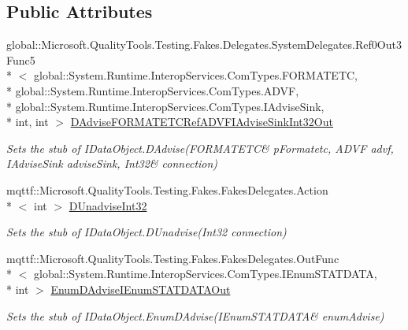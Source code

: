 \subsection*{Public Attributes}
\begin{DoxyCompactItemize}
\item 
global\-::\-Microsoft.\-Quality\-Tools.\-Testing.\-Fakes.\-Delegates.\-System\-Delegates.\-Ref0\-Out3\-Func5\\*
$<$ global\-::\-System.\-Runtime.\-Interop\-Services.\-Com\-Types.\-F\-O\-R\-M\-A\-T\-E\-T\-C, \\*
global\-::\-System.\-Runtime.\-Interop\-Services.\-Com\-Types.\-A\-D\-V\-F, \\*
global\-::\-System.\-Runtime.\-Interop\-Services.\-Com\-Types.\-I\-Advise\-Sink, \\*
int, int $>$ \hyperlink{class_system_1_1_runtime_1_1_interop_services_1_1_com_types_1_1_fakes_1_1_stub_i_data_object_a64d717ebe75e5eb2a2b469bf6dd5d526}{D\-Advise\-F\-O\-R\-M\-A\-T\-E\-T\-C\-Ref\-A\-D\-V\-F\-I\-Advise\-Sink\-Int32\-Out}
\begin{DoxyCompactList}\small\item\em Sets the stub of I\-Data\-Object.\-D\-Advise(F\-O\-R\-M\-A\-T\-E\-T\-C\& p\-Formatetc, A\-D\-V\-F advf, I\-Advise\-Sink advise\-Sink, Int32\& connection)\end{DoxyCompactList}\item 
mqttf\-::\-Microsoft.\-Quality\-Tools.\-Testing.\-Fakes.\-Fakes\-Delegates.\-Action\\*
$<$ int $>$ \hyperlink{class_system_1_1_runtime_1_1_interop_services_1_1_com_types_1_1_fakes_1_1_stub_i_data_object_adb19c372293877e1ccf66409179c1d25}{D\-Unadvise\-Int32}
\begin{DoxyCompactList}\small\item\em Sets the stub of I\-Data\-Object.\-D\-Unadvise(\-Int32 connection)\end{DoxyCompactList}\item 
mqttf\-::\-Microsoft.\-Quality\-Tools.\-Testing.\-Fakes.\-Fakes\-Delegates.\-Out\-Func\\*
$<$ global\-::\-System.\-Runtime.\-Interop\-Services.\-Com\-Types.\-I\-Enum\-S\-T\-A\-T\-D\-A\-T\-A, \\*
int $>$ \hyperlink{class_system_1_1_runtime_1_1_interop_services_1_1_com_types_1_1_fakes_1_1_stub_i_data_object_a906bad84d27c951d601ab7fd1b34a2c3}{Enum\-D\-Advise\-I\-Enum\-S\-T\-A\-T\-D\-A\-T\-A\-Out}
\begin{DoxyCompactList}\small\item\em Sets the stub of I\-Data\-Object.\-Enum\-D\-Advise(I\-Enum\-S\-T\-A\-T\-D\-A\-T\-A\& enum\-Advise)\end{DoxyCompactList}\item 

\end{DoxyCompactItemize}
